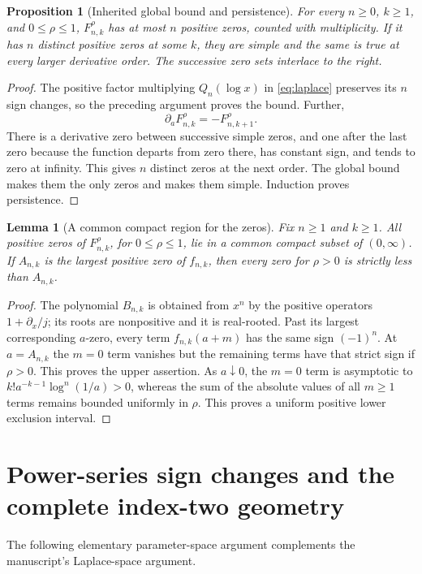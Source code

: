 \documentclass[11pt,letterpaper]{article}
\numberwithin{equation}{section}
\newtheorem{lemma}[theorem]{Lemma}
\newtheorem{proposition}[theorem]{Proposition}
\theoremstyle{definition}\newtheorem{definition}[theorem]{Definition}
\theoremstyle{remark}\newtheorem{remark}[theorem]{Remark}
\newcommand{\F}[3]{F_{#1,#2}^{#3}}
\begin{document}
\begin{proposition}[Inherited global bound and persistence]\label{prop:bound}
For every $n\ge0$, $k\ge1$, and $0\le\rho\le1$, $\F nk\rho$ has at most $n$ positive zeros, counted with multiplicity. If it has $n$ distinct positive zeros at some $k$, they are simple and the same is true at every larger derivative order. The successive zero sets interlace to the right.
\end{proposition}
\begin{proof}
The positive factor multiplying $Q_n(\log x)$ in \eqref{eq:laplace} preserves its $n$ sign changes, so the preceding argument proves the bound. Further,
\begin{equation}\label{eq:derivative}
 \partial_a\F nk\rho=-\F n{k+1}\rho.
\end{equation}
There is a derivative zero between successive simple zeros, and one after the last zero because the function departs from zero there, has constant sign, and tends to zero at infinity. This gives $n$ distinct zeros at the next order. The global bound makes them the only zeros and makes them simple. Induction proves persistence.
\end{proof}

\begin{lemma}[A common compact region for the zeros]\label{lem:compact}
Fix $n\ge1$ and $k\ge1$. All positive zeros of $\F nk\rho$, for $0\le\rho\le1$, lie in a common compact subset of $(0,\infty)$. If $A_{n,k}$ is the largest positive zero of $f_{n,k}$, then every zero for $\rho>0$ is strictly less than $A_{n,k}$.
\end{lemma}
\begin{proof}
The polynomial $B_{n,k}$ is obtained from $x^n$ by the positive operators $1+\partial_x/j$; its roots are nonpositive and it is real-rooted. Past its largest corresponding $a$-zero, every term $f_{n,k}(a+m)$ has the same sign $(-1)^n$. At $a=A_{n,k}$ the $m=0$ term vanishes but the remaining terms have that strict sign if $\rho>0$. This proves the upper assertion. As $a\downarrow0$, the $m=0$ term is asymptotic to $k!a^{-k-1}\log^n(1/a)>0$, whereas the sum of the absolute values of all $m\ge1$ terms remains bounded uniformly in $\rho$. This proves a uniform positive lower exclusion interval.
\end{proof}

\section{Power-series sign changes and the complete index-two geometry}\label{sec:n2}
The following elementary parameter-space argument complements the manuscript's Laplace-space argument.
\end{document}

